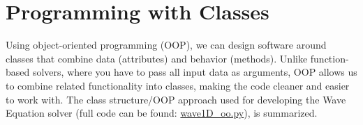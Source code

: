 \documentclass{article}
\begin{document}
\begin{comment}
					\textbf{Persistence} & Persistent; files remain accessible after the program ends. & Persistent; cached files remain accessible across sessions. \\ 
					\textbf{Learning Curve} & Easy to learn and implement. & Slightly steeper; requires understanding \texttt{joblib} and caching mechanisms. \\ 
					\textbf{Limitations} & 
					\begin{itemize}[leftmargin=*]
						\item Limited to arrays and simple file storage.
						\item Requires explicit names for arrays.
					\end{itemize} 
					& 
					\begin{itemize}[leftmargin=*]
						\item Requires proper directory management for large-scale caching.
						\item Cache directories can become large if not managed.
					\end{itemize} \\ 
					\textbf{Best Use Case} & Saving multiple arrays compactly in a single file. & Efficiently caching intermediate results or datasets in iterative workflows. \\ 
					\bottomrule
				\end{tabular}
				\caption{Comparison of \texttt{numpy.savez} and \texttt{joblib Storage} for managing large arrays.}
				\label{tab:array_saving_methods}
			\end{table}
			\newpage
				content...
			\end{comment}
			
	\section{Programming with Classes}
		Using object-oriented programming (OOP), we can design software around classes that combine data (attributes) and behavior (methods). Unlike function-based solvers, where you have to pass all input data as arguments, OOP allows us to combine related functionality into classes, making the code cleaner and easier to work with. The class structure/OOP approach used for developing the Wave Equation solver (full code can be found: \href{https://github.com/hplgit/fdm-book/blob/master/src/softeng2/wave1D_oo.py}{wave1D\_oo.py}), is summarized.
		
\end{document}
